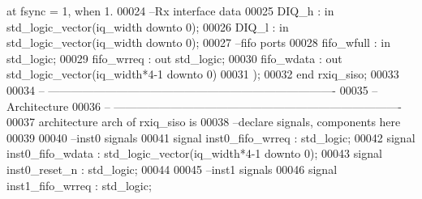 \begin{DoxyCode}
{       at fsync = 1, when 1.}
00024 \textcolor{keyword}{      --Rx interface data }
00025       \textcolor{vhdlchar}{DIQ_h}         \textcolor{vhdlchar}{:} \textcolor{keywordflow}{in} \textcolor{comment}{std\_logic\_vector}\textcolor{vhdlchar}{(}\textcolor{vhdlchar}{iq_width} \textcolor{keywordflow}{downto} \textcolor{vhdllogic}{}\textcolor{vhdllogic}{0}\textcolor{vhdlchar}{)};
00026         \textcolor{vhdlchar}{DIQ_l}          \textcolor{vhdlchar}{:} \textcolor{keywordflow}{in} \textcolor{comment}{std\_logic\_vector}\textcolor{vhdlchar}{(}\textcolor{vhdlchar}{iq_width} \textcolor{keywordflow}{downto} \textcolor{vhdllogic}{}\textcolor{vhdllogic}{0}\textcolor{vhdlchar}{)};
00027 \textcolor{keyword}{      --fifo ports }
00028       \textcolor{vhdlchar}{fifo_wfull}  \textcolor{vhdlchar}{:} \textcolor{keywordflow}{in} \textcolor{comment}{std\_logic};
00029       \textcolor{vhdlchar}{fifo_wrreq}  \textcolor{vhdlchar}{:} \textcolor{keywordflow}{out} \textcolor{comment}{std\_logic};
00030       \textcolor{vhdlchar}{fifo_wdata}  \textcolor{vhdlchar}{:} \textcolor{keywordflow}{out} \textcolor{comment}{std\_logic\_vector}\textcolor{vhdlchar}{(}\textcolor{vhdlchar}{iq_width}\textcolor{vhdlchar}{*}\textcolor{vhdllogic}{4-1} \textcolor{keywordflow}{downto} \textcolor{vhdllogic}{}\textcolor{vhdllogic}{0}\textcolor{vhdlchar}{)}   
00031         \textcolor{vhdlchar}{)};
00032 \textcolor{keywordflow}{end} \textcolor{vhdlchar}{rxiq\_siso};
00033 
00034 \textcolor{keyword}{-- ----------------------------------------------------------------------------}
00035 \textcolor{keyword}{-- Architecture}
00036 \textcolor{keyword}{-- ----------------------------------------------------------------------------}
00037 \textcolor{keywordflow}{architecture} arch \textcolor{keywordflow}{of} rxiq_siso is
00038 \textcolor{keyword}{--declare signals,  components here}
00039 
00040 \textcolor{keyword}{--inst0 signals}
00041 \textcolor{keywordflow}{signal} \textcolor{vhdlchar}{inst0_fifo_wrreq} \textcolor{vhdlchar}{:} \textcolor{comment}{std\_logic};
00042 \textcolor{keywordflow}{signal} \textcolor{vhdlchar}{inst0_fifo_wdata} \textcolor{vhdlchar}{:} \textcolor{comment}{std\_logic\_vector}\textcolor{vhdlchar}{(}\textcolor{vhdlchar}{iq_width}\textcolor{vhdlchar}{*}\textcolor{vhdllogic}{4-1} \textcolor{keywordflow}{downto} \textcolor{vhdllogic}{}\textcolor{vhdllogic}{0}\textcolor{vhdlchar}{)};
00043 \textcolor{keywordflow}{signal} \textcolor{vhdlchar}{inst0_reset_n}        \textcolor{vhdlchar}{:} \textcolor{comment}{std\_logic};
00044 
00045 \textcolor{keyword}{--inst1 signals}
00046 \textcolor{keywordflow}{signal} \textcolor{vhdlchar}{inst1_fifo_wrreq} \textcolor{vhdlchar}{:} \textcolor{comment}{std\_logic};

\end{DoxyCode}
